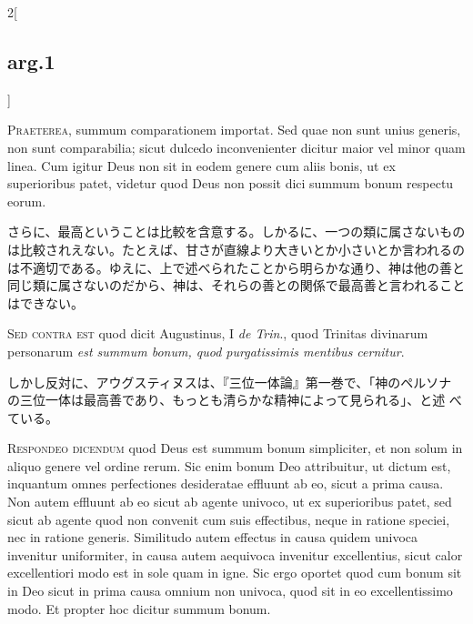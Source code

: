 \documentclass[paper=a4paper,fontsize=10pt,jafontsize=9pt,titlepage]{jlreq}
\begin{document}
\begin{paracol}{2}[\subsection{arg.1}]

{\scshape Praeterea}, summum comparationem importat. Sed quae non sunt unius
 generis, non sunt comparabilia; sicut dulcedo inconvenienter dicitur
 maior vel minor quam linea. Cum igitur Deus non sit in eodem genere cum
 aliis bonis, ut ex superioribus patet, videtur quod Deus non possit
 dici summum bonum respectu eorum.

\switchcolumn

さらに、最高ということは比較を含意する。しかるに、一つの類に属さないものは比較されえない。たとえば、甘さが直線より大きいとか小さいとか言われるのは不適切である。ゆえに、上で述べられたことから明らかな通り、神は他の善と同じ類に属さないのだから、神は、それらの善との関係で最高善と言われることはできない。

\switchcolumn*[\subsection{s.c.}]

{\scshape Sed contra est} quod dicit Augustinus, I {\itshape de Trin}.,
 quod Trinitas divinarum personarum {\itshape est summum bonum, quod
 purgatissimis mentibus cernitur}.

\switchcolumn

しかし反対に、アウグスティヌスは、『三位一体論』第一巻で、「神のペルソナ
 の三位一体は最高善であり、もっとも清らかな精神によって見られる」、と述
 べている。


{\scshape Respondeo dicendum} quod Deus est summum bonum simpliciter, et
 non solum in aliquo genere vel ordine rerum. Sic enim bonum Deo
 attribuitur, ut dictum est, inquantum omnes perfectiones desideratae
 effluunt ab eo, sicut a prima causa. Non autem effluunt ab eo sicut ab
 agente univoco, ut ex superioribus patet, sed sicut ab agente quod non
 convenit cum suis effectibus, neque in ratione speciei, nec in ratione
 generis. Similitudo autem effectus in causa quidem univoca invenitur
 uniformiter, in causa autem aequivoca invenitur excellentius, sicut
 calor excellentiori modo est in sole quam in igne. Sic ergo oportet
 quod cum bonum sit in Deo sicut in prima causa omnium non univoca, quod
 sit in eo excellentissimo modo. Et propter hoc dicitur summum bonum.


\end{paracol}
\end{document}
